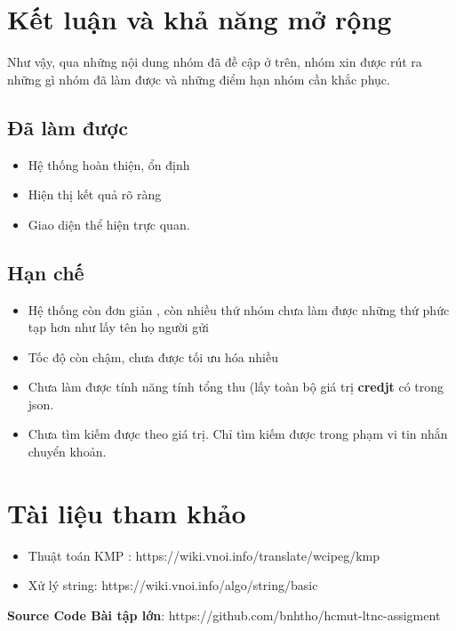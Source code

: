 \section{Kết luận và khả năng mở rộng}
Như vậy, qua những nội dung nhóm đã đề cập ở trên, nhóm xin được rút ra những gì nhóm đã làm được và những điểm hạn nhóm cần khắc phục.

\subsection{Đã làm được}
\begin{itemize}
    \item Hệ thống hoàn thiện, ổn định 
    \item Hiện thị kết quả rõ ràng
    \item Giao diện thể hiện trực quan.
\end{itemize}

\subsection{Hạn chế}
\begin{itemize}
    \item Hệ thống còn đơn giản , còn nhiều thứ nhóm chưa làm được những thứ phức tạp hơn như lấy tên họ người gửi
\item Tốc độ còn chậm, chưa được tối ưu hóa nhiều
\item Chưa làm được tính năng tính tổng thu (lấy toàn bộ giá trị \textbf{credjt} có trong json.
\item Chưa tìm kiếm được theo giá trị. Chỉ tìm kiếm được trong phạm vi tin nhắn chuyển khoản.
\end{itemize}


\section{Tài liệu tham khảo}
\begin{itemize}
    \item Thuật toán KMP : https://wiki.vnoi.info/translate/wcipeg/kmp
    \item Xử lý string: https://wiki.vnoi.info/algo/string/basic
\end{itemize}

\textbf{Source Code Bài tập lớn}: https://github.com/bnhtho/hcmut-ltnc-assigment 